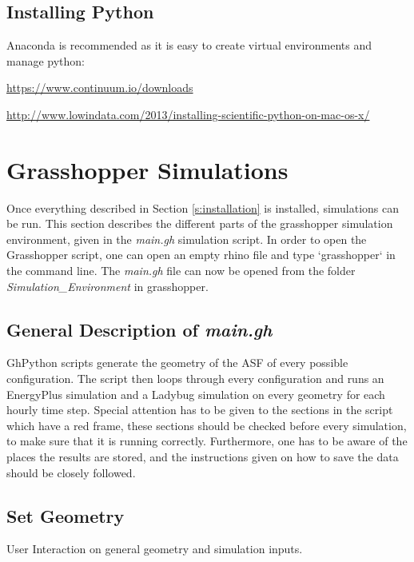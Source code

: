 	\subsection{Installing Python}
	Anaconda is recommended as it is easy to create virtual environments and manage python:

	\url{https://www.continuum.io/downloads}\\


	\url{http://www.lowindata.com/2013/installing-scientific-python-on-mac-os-x/}\\



\section{Grasshopper Simulations}

	
	Once everything described in Section \ref{s:installation} is installed, simulations can be run. This section describes the different parts of the grasshopper simulation environment, given in the \emph{main.gh} simulation script. In order to open the Grasshopper script, one can open an empty rhino file and type `grasshopper` in the command line. The \emph{main.gh} file can now be opened from the folder \emph{Simulation\_Environment} in grasshopper.



	\subsection{General Description of \emph{main.gh}}
		GhPython scripts generate the geometry of the ASF of every possible configuration. The script then loops through every configuration and runs an EnergyPlus simulation and a Ladybug simulation on every geometry for each hourly time step. Special attention has to be given to the sections in the script which have a red frame, these sections should be checked before every simulation, to make sure that it is running correctly. Furthermore, one has to be aware of the places the results are stored, and the instructions given on how to save the data should be closely followed. 



	\subsection{Set Geometry}
	User Interaction on general geometry and simulation inputs.

